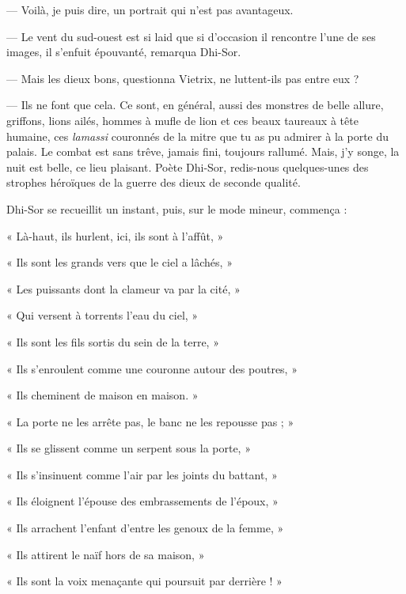 \documentclass[a4paper, 11pt, oneside, polutonikogreek, french]{article}
\begin{document}
--- Voilà, je puis dire, un portrait qui n'est pas avantageux.

--- Le vent du sud-ouest est si laid que si d'occasion il rencontre l'une de ses images, il s'enfuit épouvanté, remarqua Dhi-Sor.

\bigskip
\centerline{\EightStarTaper}
\centerline{\EightStarTaper\EightStarTaper}
\bigskip

--- Mais les dieux bons, questionna Vietrix, ne luttent-ils pas entre eux ?

--- Ils ne font que cela. Ce sont, en général, aussi des monstres de belle allure, griffons, lions ailés, hommes à mufle de lion et ces beaux taureaux à tête humaine, ces \emph{lamassi} couronnés de la mitre que tu as pu admirer à la porte du palais. Le combat est sans trêve, jamais fini, toujours rallumé. Mais, j'y songe, la nuit est belle, ce lieu plaisant. Poète Dhi-Sor, redis-nous quelques-unes des strophes héroïques de la guerre des dieux de seconde qualité.

\bigskip
\centerline{\EightStarTaper}
\centerline{\EightStarTaper\EightStarTaper}
\bigskip

Dhi-Sor se recueillit un instant, puis, sur le mode mineur, commença :

« Là-haut, ils hurlent, ici, ils sont à l'affût, »

« Ils sont les grands vers que le ciel a lâchés, »

« Les puissants dont la clameur va par la cité, »

« Qui versent à torrents l'eau du ciel, »

« Ils sont les fils sortis du sein de la terre, »

« Ils s'enroulent comme une couronne autour des poutres, »

« Ils cheminent de maison en maison. »

« La porte ne les arrête pas, le banc ne les repousse pas ; »

« Ils se glissent comme un serpent sous la porte, »

« Ils s'insinuent comme l'air par les joints du battant, »

« Ils éloignent l'épouse des embrassements de l'époux, »

« Ils arrachent l'enfant d'entre les genoux de la femme, »

« Ils attirent le naïf hors de sa maison, »

« Ils sont la voix menaçante qui poursuit par derrière ! »

\bigskip
\centerline{\EightStarTaper}
\centerline{\EightStarTaper\EightStarTaper}
\bigskip
\end{document}
